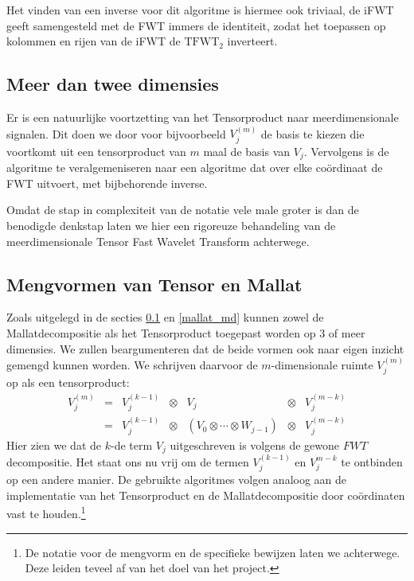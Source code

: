 Het vinden van een inverse voor dit algoritme is hiermee ook triviaal, de iFWT geeft samengesteld met de FWT
immers de identiteit, zodat het toepassen op kolommen en rijen van de iFWT de $\mathrm{TFWT}_2$ inverteert.

\subsection{Meer dan twee dimensies}
\label{tensor_md}
Er is een natuurlijke voortzetting van het Tensorproduct naar meerdimensionale signalen.
Dit doen we door voor bijvoorbeeld  $V^{(m)}_j$ de basis te kiezen die voortkomt uit
een tensorproduct van $m$ maal de basis van $V_j$.
Vervolgens is de algoritme te veralgemeniseren naar een algoritme dat over elke co\"ordinaat de FWT 
uitvoert, met bijbehorende inverse.

Omdat de stap in complexiteit van de notatie vele male groter is dan de benodigde denkstap laten we hier een rigoreuze
behandeling van de meerdimensionale Tensor Fast Wavelet Transform achterwege.

\subsection{Mengvormen van Tensor en Mallat}
Zoals uitgelegd in de secties \ref{tensor_md} en \ref{mallat_md} kunnen zowel de Mallatdecompositie als
het Tensorproduct toegepast worden op $3$ of meer dimensies. We zullen beargumenteren dat de beide
vormen ook naar eigen inzicht gemengd kunnen worden. We schrijven daarvoor de $m$-dimensionale 
ruimte $V_j^{(m)}$ op als een tensorproduct:
\begin{equation*}
\begin{array}{ccccccc}
  V_j^{(m)} &=& V_j^{(k-1)} &\otimes&              V_j                     &\otimes& V_j^{(m-k)} \\
            &=& V_j^{(k-1)} &\otimes& (V_0 \otimes \cdots \otimes W_{j-1}) &\otimes& V_j^{(m-k)}
\end{array}
\end{equation*}
Hier zien we dat de $k$-de term $V_j$ uitgeschreven is volgens de gewone $FWT$
decompositie. Het staat ons nu vrij om de termen $V_j^{(k-1)}$ en $V_j^{m-k}$ te ontbinden
op een andere manier. De gebruikte algoritmes volgen analoog aan de implementatie van het Tensorproduct
en de Mallatdecompositie door co\"ordinaten vast te houden.\footnote{De notatie voor de mengvorm en de specifieke bewijzen laten we achterwege. Deze leiden teveel af van het doel van het project.}

